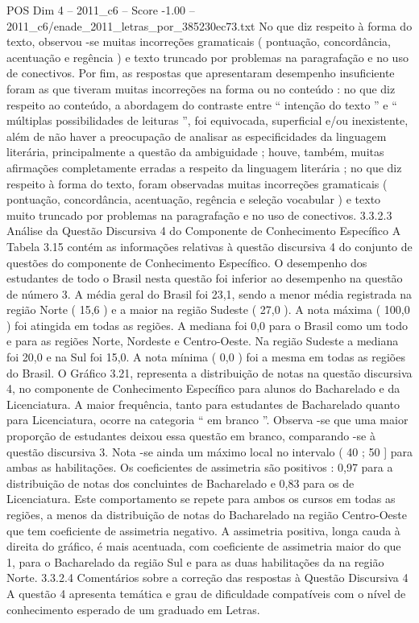 \begin{textsample}{POS Dim 4 – 2011\_c6 – Score -1.00 – 2011\_c6/enade\_2011\_letras\_por\_385230ec73.txt}
No que diz respeito à forma do texto, observou -se muitas incorreções gramaticais ( pontuação, concordância, acentuação e regência ) e texto truncado por problemas na paragrafação e no uso de conectivos.
Por fim, as respostas que apresentaram desempenho insuficiente foram as que tiveram muitas incorreções na forma ou no conteúdo : no que diz respeito ao conteúdo, a abordagem do contraste entre “ intenção do texto ” e “ múltiplas possibilidades de leituras ”, foi equivocada, superficial e/ou inexistente, além de não haver a preocupação de analisar as especificidades da linguagem literária, principalmente a questão da ambiguidade ; houve, também, muitas afirmações completamente erradas a respeito da linguagem literária ; no que diz respeito à forma do texto, foram observadas muitas incorreções gramaticais ( pontuação, concordância, acentuação, regência e seleção vocabular ) e texto muito truncado por problemas na paragrafação e no uso de conectivos. 3.3.2.3 Análise da Questão Discursiva 4 do Componente de Conhecimento Específico A Tabela 3.15 contém as informações relativas à questão discursiva 4 do conjunto de questões do componente de Conhecimento Específico.
O desempenho dos estudantes de todo o Brasil nesta questão foi inferior ao desempenho na questão de número 3.
A média geral do Brasil foi 23,1, sendo a menor média registrada na região Norte ( 15,6 ) e a maior na região Sudeste ( 27,0 ).
A nota máxima ( 100,0 ) foi atingida em todas as regiões.
A mediana foi 0,0 para o Brasil como um todo e para as regiões Norte, Nordeste e Centro-Oeste.
Na região Sudeste a mediana foi 20,0 e na Sul foi 15,0.
A nota mínima ( 0,0 ) foi a mesma em todas as regiões do Brasil.
O Gráfico 3.21, representa a distribuição de notas na questão discursiva 4, no componente de Conhecimento Específico para alunos do Bacharelado e da Licenciatura.
A maior frequência, tanto para estudantes de Bacharelado quanto para Licenciatura, ocorre na categoria “ em branco ”.
Observa -se que uma maior proporção de estudantes deixou essa questão em branco, comparando -se à questão discursiva 3.
Nota -se ainda um máximo local no intervalo ( 40 ; 50 ] para ambas as habilitações.
Os coeficientes de assimetria são positivos : 0,97 para a distribuição de notas dos concluintes de Bacharelado e 0,83 para os de Licenciatura.
Este comportamento se repete para ambos os cursos em todas as regiões, a menos da distribuição de notas do Bacharelado na região Centro-Oeste que tem coeficiente de assimetria negativo.
A assimetria positiva, longa cauda à direita do gráfico, é mais acentuada, com coeficiente de assimetria maior do que 1, para o Bacharelado da região Sul e para as duas habilitações da na região Norte. 3.3.2.4 Comentários sobre a correção das respostas à Questão Discursiva 4 A questão 4 apresenta temática e grau de dificuldade compatíveis com o nível de conhecimento esperado de um graduado em Letras.

\end{textsample}
